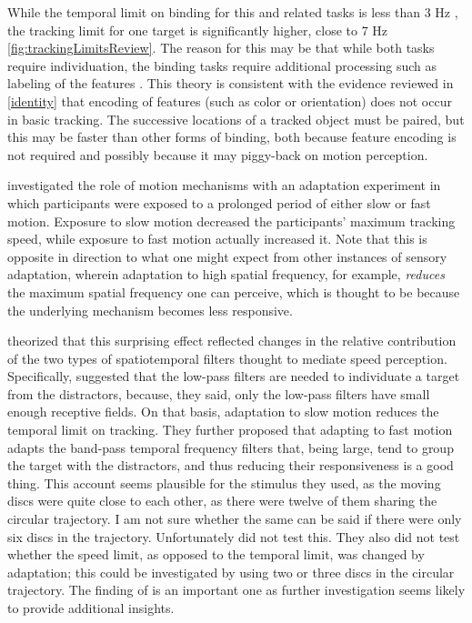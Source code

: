 \documentclass[
]{book}
\begin{document}
While the temporal limit on binding for this and related tasks is less than 3 Hz \citep{holcombeEarlyBindingFeature2001, arnoldPerceptualPairingColour2005}, the tracking limit for one target is significantly higher, close to 7 Hz \ref{fig:trackingLimitsReview}. The reason for this may be that while both tasks require individuation, the binding tasks require additional processing such as labeling of the features \citep{holcombeEarlyBindingFeature2001, fujisakiCommonPerceptualTemporal2010}. This theory is consistent with the evidence reviewed in \ref{identity} that encoding of features (such as color or orientation) does not occur in basic tracking. The successive locations of a tracked object must be paired, but this may be faster than other forms of binding, both because feature encoding is not required and possibly because it may piggy-back on motion perception.

\citet{marinovicAttentionaltrackingAcuityModulated2013} investigated the role of motion mechanisms with an adaptation experiment in which participants were exposed to a prolonged period of either slow or fast motion. Exposure to slow motion decreased the participants' maximum tracking speed, while exposure to fast motion actually increased it. Note that this is opposite in direction to what one might expect from other instances of sensory adaptation, wherein adaptation to high spatial frequency, for example, \emph{reduces} the maximum spatial frequency one can perceive, which is thought to be because the underlying mechanism becomes less responsive.

\citet{marinovicAttentionaltrackingAcuityModulated2013} theorized that this surprising effect reflected changes in the relative contribution of the two types of spatiotemporal filters thought to mediate speed perception. Specifically, \citet{marinovicAttentionaltrackingAcuityModulated2013} suggested that the low-pass filters are needed to individuate a target from the distractors, because, they said, only the low-pass filters have small enough receptive fields. On that basis, adaptation to slow motion reduces the temporal limit on tracking. They further proposed that adapting to fast motion adapts the band-pass temporal frequency filters that, being large, tend to group the target with the distractors, and thus reducing their responsiveness is a good thing. This account seems plausible for the stimulus they used, as the moving discs were quite close to each other, as there were twelve of them sharing the circular trajectory. I am not sure whether the same can be said if there were only six discs in the trajectory. Unfortunately \citet{marinovicAttentionaltrackingAcuityModulated2013} did not test this. They also did not test whether the speed limit, as opposed to the temporal limit, was changed by adaptation; this could be investigated by using two or three discs in the circular trajectory. The finding of \citet{marinovicAttentionaltrackingAcuityModulated2013} is an important one as further investigation seems likely to provide additional insights.
\end{document}
